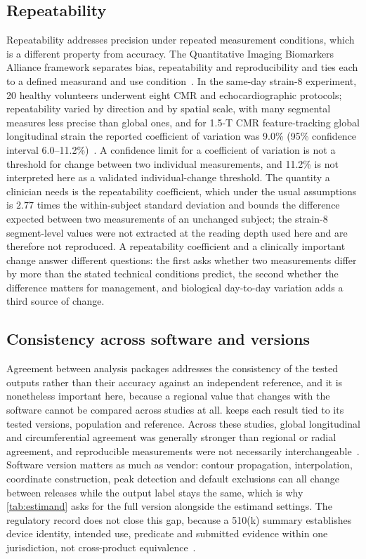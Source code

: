 \subsection{Repeatability}\label{sec:repeatability}

Repeatability addresses precision under repeated measurement conditions, which is a different
property from accuracy. The Quantitative Imaging Biomarkers Alliance framework separates bias,
repeatability and reproducibility and ties each to a defined measurand and use
condition~\citep{raunig2015}. In the same-day strain-8 experiment, 20 healthy volunteers underwent
eight CMR and echocardiographic protocols; repeatability varied by direction and by spatial scale,
with many segmental measures less precise than global ones, and for 1.5-T CMR feature-tracking
global longitudinal strain the reported coefficient of variation was 9.0\% (95\% confidence interval
6.0--11.2\%)~\citep{bell2025strain8}. A confidence limit for a coefficient of variation is not a
threshold for change between two individual measurements, and 11.2\% is not interpreted here as a
validated individual-change threshold. The quantity a clinician needs is the repeatability coefficient, which under the usual assumptions
is $2.77$ times the within-subject standard deviation and bounds the difference expected between two
measurements of an unchanged subject; the strain-8 segment-level values were not extracted at the
reading depth used here and are therefore not reproduced. A repeatability coefficient and a
clinically important change answer different questions: the first asks whether two measurements differ by more than the stated
technical conditions predict, the second whether the difference matters for management, and
biological day-to-day variation adds a third source of change.

\subsection{Consistency across software and versions}\label{sec:crosssoftware}

Agreement between analysis packages addresses the consistency of the tested outputs rather than
their accuracy against an independent reference, and it is nonetheless important here, because a
regional value that changes with the software cannot be compared across studies at all.
 keeps each result tied to its tested versions, population and reference. Across
these studies, global longitudinal and circumferential agreement was generally stronger than
regional or radial agreement, and reproducible measurements were not necessarily
interchangeable~\citep{militaru2021,goetze2026,ochs2026}. Software version matters as much as
vendor: contour propagation, interpolation, coordinate construction, peak detection and default
exclusions can all change between releases while the output label stays the same, which is why
\cref{tab:estimand} asks for the full version alongside the estimand settings. The regulatory record
does not close this gap, because a 510(k) summary establishes device identity, intended use,
predicate and submitted evidence within one jurisdiction, not cross-product
equivalence~\citep{fda2022qib,fdaK232661}.

